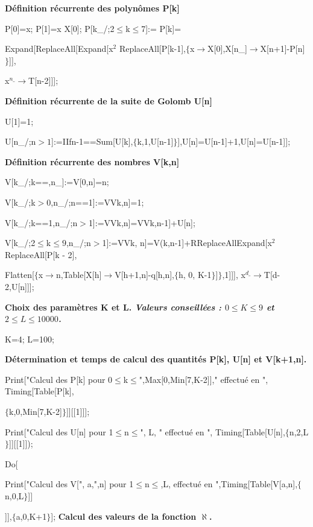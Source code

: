 \noindent
{\bf 
D\'efinition r\'ecurrente des polyn\^omes P[k]
}
\medskip


\noindent
P[0]=x;
P[1]=x X[0]; P[k\_/;2$\le$k$\le$7]:=
P[k]=

\noindent
Expand[ReplaceAll[Expand[x$^2$ 
ReplaceAll[P[k-1],$\{$x$\rightarrow$X[0],X[n\_]$\rightarrow$X[n+1]-P[n]$\}$]],

\noindent
x$^{n\_}\rightarrow$T[n-2]]];
\medskip

\noindent
{\bf 
D\'efinition r\'ecurrente de la suite de Golomb U[n]
}
\medskip

\noindent
U[1]=1;

\noindent
U[n\_/;n$>1$]:=IIfn-1==Sum[U[k],$\{$k,1,U[n-1]$\}$],U[n]=U[n-1]+1,U[n]=U[n-1]];
\medskip

\noindent
{\bf 
D\'efinition r\'ecurrente des nombres V[k,n]
}
\medskip

\noindent
V[k\_/;k==,n\_]:=V[0,n]=n;

\noindent
V[k\_/;k$>$0,n\_/;n==1]:=VVk,n]=1;

\noindent
V[k\_/;k==1,n\_/;n$>$1]:=VVk,n]=VVk,n-1]+U[n]; 

\noindent
V[k\_/;2$\le$k$\le9$,n\_/;n$>$1]:=VVk, n]=V(k,n-1]+RReplaceAllExpand[x$^2$ ReplaceAll[P[k - 2],

\noindent
Flatten[$\{$x$\rightarrow$n,Table[X[h]$\rightarrow$V[h+1,n]-q[h,n],$\{$h, 0, K-1$\}$]$\}$,1]]], x$^{d\_}\rightarrow$T[d-2,U[n]]];
\medskip

\noindent
{\bf
Choix des param\`etres K et L. 
{\it Valeurs conseill\'ees :  $0\le K\le 9$ et $2\le L\le10000$. }
}
\medskip

\noindent
K=4;
L=100;
\medskip

\noindent
{\bf 
D\'etermination et temps de calcul des quantit\'es P[k], U[n] et V[k+1,n]. 
}
\medskip

\noindent
Print["Calcul des P[k] pour 0$\le$k$\le$",Max[0,Min[7,K-2]]," effectu\'e en  ", 
Timing[Table[P[k],

\noindent
$\{$k,0,Min[7,K-2]$\}$]][[1]]];

\noindent
Print["Calcul des U[n] pour 1$\le$n$\le$", L, " effectu\'e en ",
Timing[Table[U[n],$\{$n,2,L$\}$]][[1]]);

\noindent
Do[

\noindent
Print["Calcul des V[", a,",n] pour 1$\le$n$\le$,L, effectu\'e en ",Timing[Table[V[a,n],$\{$n,0,L$\}$]]

\noindent
[[1]]],$\{$a,0,K+1$\}$];
\medskip
\noindent
{\bf 
Calcul des valeurs de la fonction $\aleph$. 
}
\medskip

